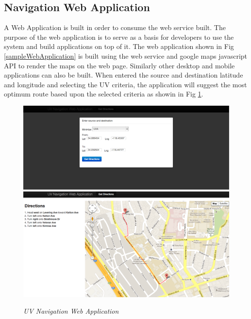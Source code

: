\documentclass[10pt]{sigplan-proc-varsize}
\begin{document}
\subsection{Navigation Web Application}
A Web Application is built in order to consume the web service built. The purpose of the web application is to serve as a basis for developers to use the system and build applications on top of it. The web application shown in Fig \ref{sampleWebApplication} is built using the web service and google maps javascript API to render the maps on the web page. Similarly other desktop and mobile applications can also be built. When entered the source and destination latitude and longitude and selecting the UV criteria, the application will suggest the most optimum route based upon the selected criteria as showin in Fig \ref{fig:webapp}.
\begin{figure}
\begin{center}
\includegraphics[scale=0.19]{webapp1.png}
\includegraphics[scale=0.19]{webapp2.png}
\caption{\small \sl UV Navigation Web Application }
\label{fig:webapp}
\end{center}
\end{figure}
\end{document}

